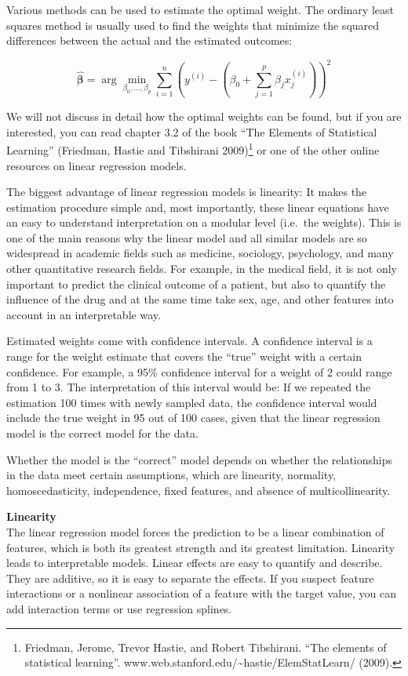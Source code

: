 \documentclass[
  10pt,
]{scrbook}
\begin{document}
Various methods can be used to estimate the optimal weight.
The ordinary least squares method is usually used to find the weights that minimize the squared differences between the actual and the estimated outcomes:

\[\hat{\boldsymbol{\beta}}=\arg\!\min_{\beta_0,\ldots,\beta_p}\sum_{i=1}^n\left(y^{(i)}-\left(\beta_0+\sum_{j=1}^p\beta_jx^{(i)}_{j}\right)\right)^{2}\]

We will not discuss in detail how the optimal weights can be found, but if you are interested, you can read chapter 3.2 of the book ``The Elements of Statistical Learning'' (Friedman, Hastie and Tibshirani 2009)\footnote{Friedman, Jerome, Trevor Hastie, and Robert Tibshirani. ``The elements of statistical learning''. www.web.stanford.edu/\textasciitilde hastie/ElemStatLearn/ (2009).} or one of the other online resources on linear regression models.

The biggest advantage of linear regression models is linearity:
It makes the estimation procedure simple and, most importantly, these linear equations have an easy to understand interpretation on a modular level (i.e.~the weights).
This is one of the main reasons why the linear model and all similar models are so widespread in academic fields such as medicine, sociology, psychology, and many other quantitative research fields.
For example, in the medical field, it is not only important to predict the clinical outcome of a patient, but also to quantify the influence of the drug and at the same time take sex, age, and other features into account in an interpretable way.

Estimated weights come with confidence intervals.
A confidence interval is a range for the weight estimate that covers the ``true'' weight with a certain confidence.
For example, a 95\% confidence interval for a weight of 2 could range from 1 to 3.
The interpretation of this interval would be:
If we repeated the estimation 100 times with newly sampled data, the confidence interval would include the true weight in 95 out of 100 cases, given that the linear regression model is the correct model for the data.

Whether the model is the ``correct'' model depends on whether the relationships in the data meet certain assumptions, which are linearity, normality, homoscedasticity, independence, fixed features, and absence of multicollinearity.

\textbf{Linearity}\\
The linear regression model forces the prediction to be a linear combination of features, which is both its greatest strength and its greatest limitation.
Linearity leads to interpretable models.
Linear effects are easy to quantify and describe.
They are additive, so it is easy to separate the effects.
If you suspect feature interactions or a nonlinear association of a feature with the target value, you can add interaction terms or use regression splines.
\end{document}
